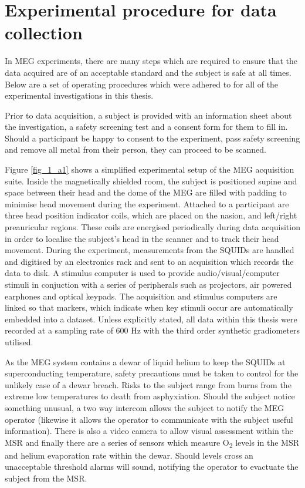 \clearpage
\section{Experimental procedure for data collection}\label{sec_data_acq}
In MEG experiments, there are many steps which are required to ensure that the data acquired are of an acceptable standard and the subject is safe at all times. Below are a set of operating procedures which were adhered to for all of the experimental investigations in this thesis. 

Prior to data acquisition, a subject is provided with an information sheet about the investigation, a safety screening test and a consent form for them to fill in. Should a participant be happy to consent to the experiment, pass safety screening and remove all metal from their person, they can proceed to be scanned. 
 
Figure \ref{fig_1_a1} shows a simplified experimental setup of the MEG acquisition suite. Inside the magnetically shielded room, the subject is positioned supine and space between their head and the dome of the MEG are filled with padding to minimise head movement during the experiment. Attached to a participant are three head position indicator coils, which are placed on the nasion, and left/right preauricular regions. These coils are energised periodically during data acquisition in order to localise the subject's head in the scanner and to track their head movement. During the experiment, measurements from the SQUIDs are handled and digitised by an electronics rack and sent to an acquisition which records the data to disk. A stimulus computer is used to provide audio/visual/computer stimuli in conjuction with a series of peripherals such as projectors, air powered earphones and optical keypads. The acquisition and stimulus computers are linked so that markers, which indicate when key stimuli occur are automatically embedded into a dataset. Unless explicitly stated, all data within this thesis were recorded at a sampling rate of 600 Hz with the third order synthetic gradiometers utilised. 

As the MEG system contains a dewar of liquid helium to keep the SQUIDs at superconducting temperature, safety precautions must be taken to control for the unlikely case of a dewar breach. Risks to the subject range from burns from the extreme low temperatures to death from asphyxiation. Should the subject notice something unusual, a two way intercom allows the subject to notify the MEG operator (likewise it allows the operator to communicate with the subject useful information). There is also a video camera to allow visual assessment within  the MSR and finally there are a series of sensors which measure O\textsubscript{2} levels in the MSR and helium evaporation rate within the dewar. Should levels cross an unacceptable threshold alarms will sound, notifying the operator to evactuate the subject from the MSR. 

